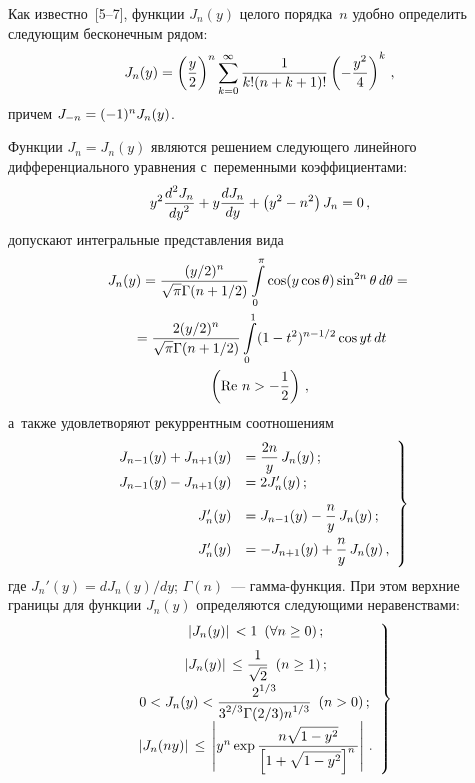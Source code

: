 \begin{multicols}{2}
Как известно~[5--7], функции $J_n(y)$ целого порядка~$n$ удобно определить 
следующим бесконечным рядом:
\begin{equation*}
    J_n (y) = \left(\fr{y}{2}\right)^n \sss_{k=0}^\infty 
    \fr{1}{k! (n+k+1)!} \left( -\fr{y^2}{4}\right)^k\,, %
    \end{equation*}
причем $J_{-n} \hm= (-1)^n J_n(y)$.

Функции $J_n =J_n (y)$ являются решением следующего линейного дифференциального 
уравнения с~переменными коэффициентами:
\begin{equation*}
y^2 \fr{d^2 J_n}{d y^2} + y \fr{dJ_n}{dy} + \left(y^2 - n^2\right) J_n =0\,, %
\end{equation*}
допускают интегральные представления вида
\begin{multline*}
J_n (y) = \fr{(y/2)^n}{\sqrt{\pi} \Gamma (n+1/2)} 
\iii_0^\pi \cos (y \cos \theta) \sin^{2n} \theta\, d\theta={}\\
{}=\fr{2(y/2)^n}{\sqrt{\pi} \Gamma ( n+1/2)} \iii_0^1 (1- t^2)^{n-1/2} \cos yt\, dt 
\\ 
\left(\mathrm{Re}\ n>-\fr{1}{2}\right)\,, %
\end{multline*}
а~также удовлетворяют рекуррентным соотноше\-ниям
   \begin{equation}
   \left.
   \begin{array}{rl}
    J_{n-1} (y) +J_{n+1} (y) &= \displaystyle\frac{\displaystyle 2n\mathstrut}{\displaystyle y\mathstrut}\,J_n (y)\,;\\[6pt]
    J_{n-1} (y) - J_{n+1}(y) &=2J_n' (y)\,;
    \\[6pt]
    J_n' (y) &= J_{n-1} (y) - \displaystyle\frac{\displaystyle n\mathstrut}{\displaystyle y\mathstrut}\, J_n (y)\,;\\[6pt]
    J_n' (y) &= - J_{n+1} (y) + \displaystyle\frac{\displaystyle n\mathstrut}{\displaystyle y\mathstrut}\, J_n (y)\,,
    \end{array}
    \right\}
    \label{e5-sin}
    \end{equation}
где $J_n' (y) = dJ_n (y)/dy $; $\Gamma (n)$~--- гам\-ма-функ\-ция.
%
При этом верхние границы для функции $J_n(y)$ определяются следующими неравенствами:
    \begin{equation}
    \left.
    \begin{array}{c}
    \,\left\vert J_n (y) \right\vert\, < 1 \enskip (\forall n \ge 0)\,; \\[6pt]
 \,\left\vert J_n (y) \right\vert\, \le \displaystyle\frac{\displaystyle 1\mathstrut}{\displaystyle \sqrt{2}\mathstrut} \enskip (n\ge 1)\,;\\[6pt]
    0<J_n (y) < \displaystyle\frac{\displaystyle 2^{1/3}\mathstrut}{\displaystyle 3^{2/3} \Gamma (2/3) n^{1/3}\mathstrut} \enskip (n>0)\,;\\[6pt]
    \,\left\vert J_n (ny) \right\vert\, \le \,\left\vert y^n \displaystyle\exp \displaystyle\frac{\displaystyle n\sqrt{1-y^2}\mathstrut}{\displaystyle \left[ 1+ \sqrt{1-y^2}\right]^n\mathstrut}\right\vert\,.
    \end{array}
    \right\}
    \label{e6-sin}
    \end{equation}


\end{multicols}
